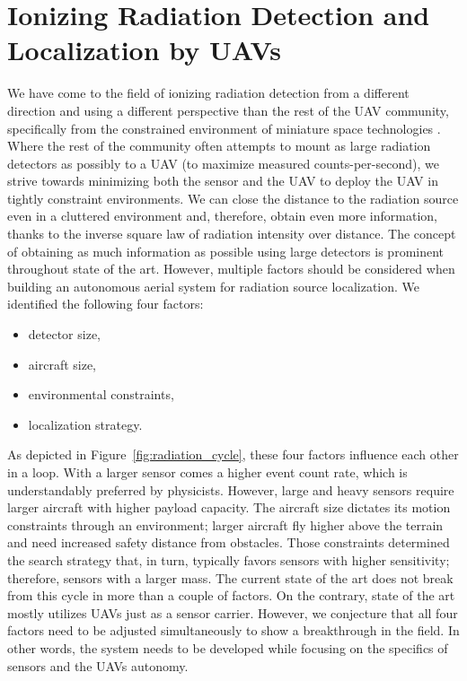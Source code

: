 \documentclass[a4paper,11pt,twoside,openright]{book}
\begin{document}
\section{Ionizing Radiation Detection and Localization by UAVs}

We have come to the field of ionizing radiation detection from a different direction and using a different perspective than the rest of the \ac{UAV} community, specifically from the constrained environment of miniature space technologies \cite{baca2016miniaturized, baca2018timepix}.
Where the rest of the community often attempts to mount as large radiation detectors as possibly to a \ac{UAV} (to maximize measured counts-per-second), we strive towards minimizing both the sensor and the \ac{UAV} to deploy the \ac{UAV} in tightly constraint environments.
We can close the distance to the radiation source even in a cluttered environment and, therefore, obtain even more information, thanks to the inverse square law of radiation intensity over distance.
The concept of obtaining as much information as possible using large detectors is prominent throughout state of the art.
However, multiple factors should be considered when building an autonomous aerial system for radiation source localization.
We identified the following four factors:
\begin{itemize}
  \item detector size,
  \item aircraft size,
  \item environmental constraints,
  \item localization strategy.
\end{itemize}
As depicted in Figure~\ref{fig:radiation_cycle}, these four factors influence each other in a loop.
With a larger sensor comes a higher event count rate, which is understandably preferred by physicists.
However, large and heavy sensors require larger aircraft with higher payload capacity.
The aircraft size dictates its motion constraints through an environment; larger aircraft fly higher above the terrain and need increased safety distance from obstacles.
Those constraints determined the search strategy that, in turn, typically favors sensors with higher sensitivity; therefore, sensors with a larger mass.
The current state of the art does not break from this cycle in more than a couple of factors.
On the contrary, state of the art mostly utilizes \acp{UAV} just as a sensor carrier.
However, we conjecture that all four factors need to be adjusted simultaneously to show a breakthrough in the field.
In other words, the system needs to be developed while focusing on the specifics of sensors and the \acp{UAV} autonomy.
\end{document}
